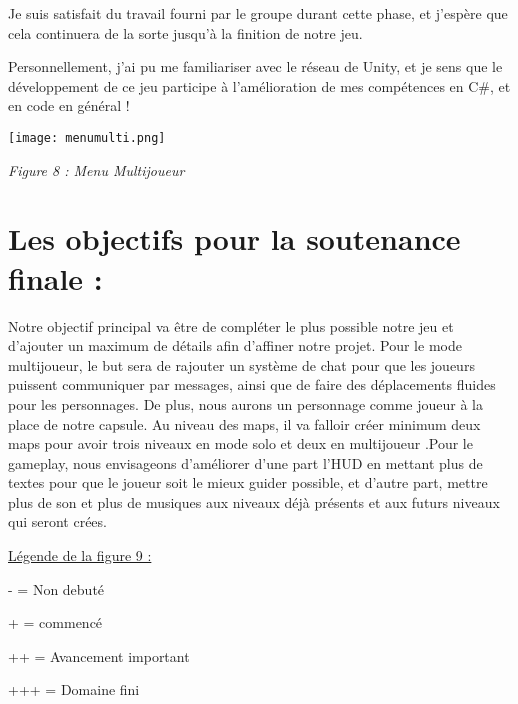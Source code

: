 \documentclass{article}
\begin{document}
    Je suis satisfait du travail fourni par le groupe durant cette phase, et j’espère que cela continuera de la sorte jusqu’à la finition de notre jeu.

Personnellement, j’ai pu me familiariser avec le réseau de Unity, et je sens que le développement de ce jeu participe à l’amélioration de mes compétences en C\#, et en code en général !

\quad

\quad

\begin{centering}

\texttt{[image: menumulti.png]}

\quad

\textit{Figure 8 : Menu Multijoueur }

\end{centering}
\newpage

\section{Les objectifs pour la soutenance finale :}

\quad

\quad

Notre objectif principal va être de compléter  le plus possible notre jeu et d’ajouter un maximum de détails afin d’affiner notre projet. Pour le mode multijoueur, le but sera de rajouter un système de chat pour que les joueurs puissent communiquer par messages, ainsi que de faire des déplacements fluides pour les personnages. De plus, nous aurons un personnage comme joueur à la place de notre capsule. Au niveau des maps, il va falloir créer minimum deux maps pour avoir trois niveaux en mode solo et deux en multijoueur .Pour le gameplay, nous envisageons d’améliorer d’une part l’HUD en mettant plus de textes pour que le joueur soit le mieux guider possible, et d’autre part, mettre plus de son et plus de musiques aux niveaux déjà présents et aux futurs niveaux qui seront crées.


\quad

\quad

\underline{Légende de la figure 9 :} 

\quad
- = Non debuté

 \quad
+ = commencé 

\quad
++ = Avancement important 

\quad
+++ = Domaine fini
\end{document}
